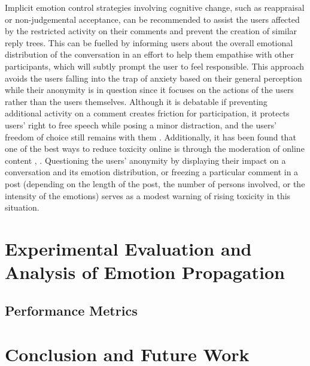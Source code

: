 \documentclass[acmtog]{acmart}
\begin{document}
Implicit emotion control strategies involving cognitive change, such as reappraisal or non-judgemental acceptance, can be recommended to assist the users affected by the restricted activity on their comments and prevent the creation of similar reply trees. This can be fuelled by informing users about the overall emotional distribution of the conversation in an effort to help them empathise with other participants, which will subtly prompt the user to feel responsible. This approach avoids the users falling into the trap of anxiety based on their general perception while their anonymity is in question since it focuses on the actions of the users rather than the users themselves. Although it is debatable if preventing additional activity on a comment creates friction for participation, it protects users' right to free speech while posing a minor distraction, and the users' freedom of choice still remains with them \cite{kiskola2021applying}. Additionally, it has been found that one of the best ways to reduce toxicity online is through the moderation of online content \cite{thomas2022s}, \cite{jhaver2021evaluating}. Questioning the users' anonymity by displaying their impact on a conversation and its emotion distribution, or freezing a particular comment in a post (depending on the length of the post, the number of persons involved, or the intensity of the emotions) serves as a modest warning of rising toxicity in this situation.






\section{Experimental Evaluation and Analysis of Emotion Propagation}
\subsection{Performance Metrics}






\section{Conclusion and Future Work}
\end{document}

